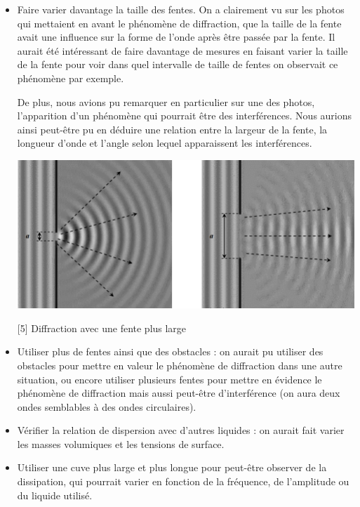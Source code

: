 \documentclass{report}
\begin{document}
\begin{itemize}[label=]
    \item Faire varier davantage la taille des fentes. On a clairement vu sur les photos qui mettaient en avant le phénomène de diffraction, que la taille de la fente avait une influence sur la forme de l'onde après être passée par la fente. Il aurait été intéressant de faire davantage de mesures en faisant varier la taille de la fente pour voir dans quel intervalle de taille de fentes on observait ce phénomène par exemple.
    
    \begin{minipage}{0.6\textwidth}
    De plus, nous avions pu remarquer en particulier sur une des photos, l'apparition d'un phénomène qui pourrait être des interférences. Nous aurions ainsi peut-être pu en déduire une relation entre la largeur de la fente, la longueur d'onde et l'angle selon lequel apparaissent les interférences. 
      \end{minipage}
    \hfill
    \begin{minipage}{0.3\textwidth}
      \includegraphics[scale=0.35]{conclu_diff.png}
      \caption{[5] Diffraction avec une fente plus large}
    \end{minipage}
    
    \newline
    \item Utiliser plus de fentes ainsi que des obstacles : on aurait pu utiliser des obstacles pour mettre en valeur le phénomène de diffraction dans une autre situation, ou encore utiliser plusieurs fentes pour mettre en évidence le phénomène de diffraction mais aussi peut-être d'interférence (on aura deux ondes semblables à des ondes circulaires). 

    \item Vérifier la relation de dispersion avec d'autres liquides : on aurait fait varier les masses volumiques et les tensions de surface.
    \item Utiliser une cuve plus large et plus longue pour peut-être observer de la dissipation, qui pourrait varier en fonction de la fréquence, de l'amplitude ou du liquide utilisé.
\end{itemize}
    
\end{document}
